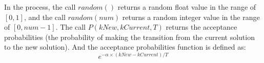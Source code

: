 In the process, the call $random()$ returns a random float value
in the range of $[0,1]$, and the call $random(num)$ returns a
random integer value in the range of $[0,num-1]$.
The call $P(kNew,kCurrent,T)$ returns the acceptance probabilities
(the probability of making the transition from the current
solution to the new solution).
And the acceptance probabilities function is defined as:
\[
e^{-\alpha \times (kNew-kCurrent)/T}
\]



